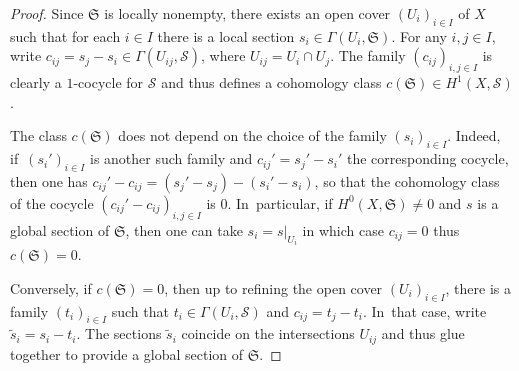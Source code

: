 \documentclass[10pt]{amsart}
\theoremstyle{definition}
\theoremstyle{plain}
\begin{document}
\begin{proof}
Since $\mathfrak S$ is locally nonempty, there exists an open cover $(U_i)_{i \in I}$ of $X$ such that for each $i \in I$ there is a local section $s_i \in \Gamma\left(U_i, \mathfrak S\right)$.
For any $i, j \in I$, write $c_{ij} = s_j-s_i \in \Gamma\left(U_{ij}, \mathcal S\right)$, where $U_{ij} = U_i \cap U_j$.
The family $\left(c_{ij}\right)_{i, j \in I}$ is clearly a $1$-cocycle for $\mathcal S$ and thus defines a cohomology class $c(\mathfrak S) \in H^1(X, \mathcal S)$.

The class $c(\mathfrak S)$ does not depend on the choice of the family $\left(s_i\right)_{i \in I}$.
Indeed, if~$\left(s_i'\right)_{i \in I}$ is another such family and $c_{ij}' = s_j'-s_i'$ the corresponding cocycle, then one has \hbox{$c_{ij}' - c_{ij} = \left(s_j'-s_j\right) - \left(s_i'-s_i\right)$}, so that the cohomology class of the cocycle $\left(c_{ij}' - c_{ij}\right)_{i, j \in I}$ is $0$. In~particular, if $H^0(X, \mathfrak S) \neq 0$ and $s$ is a global section of $\mathfrak S$, then one can take $s_i = s|_{U_i}$ in which case $c_{ij} = 0$ thus $c(\mathfrak S) = 0$.

Conversely, if $c(\mathfrak S)=0$, then up to refining the open cover $(U_i)_{i \in I}$, there is a family $\left(t_i\right)_{i \in I}$ such that $t_i \in \Gamma\left(U_i, \mathcal S\right)$ and $c_{ij} = t_j-t_i$. In~that case, write $\widetilde s_i = s_i - t_i$.
The sections $\widetilde s_i$ coincide on the intersections $U_{ij}$ and thus glue together to provide a global section of $\mathfrak S$.
\end{proof}
\end{document}
